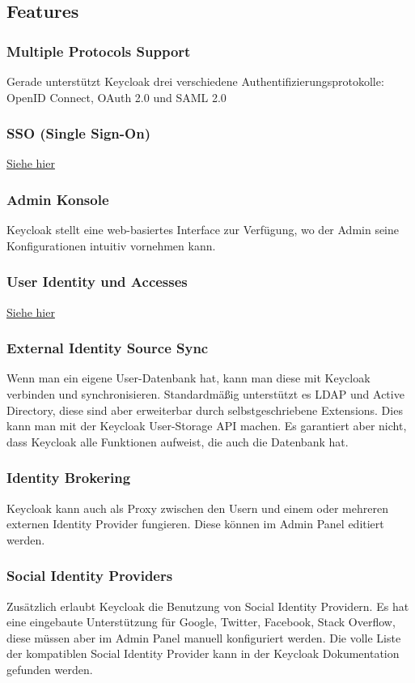 \subsection{Features}
\subsubsection{Multiple Protocols Support}
Gerade unterstützt Keycloak drei verschiedene Authentifizierungsprotokolle: OpenID Connect, OAuth 2.0 und SAML 2.0 \cite{KeyCloakDZone}
\subsubsection{SSO (Single Sign-On)}
\hyperref[sec:SSO]{Siehe hier}
\subsubsection{Admin Konsole}
Keycloak stellt eine web-basiertes Interface zur Verfügung, wo der Admin seine Konfigurationen intuitiv vornehmen kann. \cite{KeyCloakDZone}
\subsubsection{User Identity und Accesses}
\hyperref[sec:IAM]{Siehe hier}
\subsubsection{External Identity Source Sync}
Wenn man ein eigene User-Datenbank  hat, kann man diese mit Keycloak verbinden und synchronisieren. Standardmäßig unterstützt es LDAP und Active Directory, diese sind aber
erweiterbar durch selbstgeschriebene Extensions. Dies kann man mit der Keycloak User-Storage API machen. Es garantiert aber nicht, dass Keycloak alle Funktionen aufweist,
die auch die Datenbank hat. \cite{KeyCloakDZone}
\subsubsection{Identity Brokering}
Keycloak kann auch als Proxy zwischen den Usern und einem oder mehreren externen Identity Provider fungieren. Diese können im Admin Panel editiert werden. \cite{KeyCloakDZone}
\subsubsection{Social Identity Providers}
Zusätzlich erlaubt Keycloak die Benutzung von Social Identity Providern. Es hat eine eingebaute Unterstützung für Google, Twitter, Facebook, Stack Overflow, diese müssen aber 
im Admin Panel manuell konfiguriert werden. Die volle Liste der kompatiblen Social Identity Provider kann in der Keycloak Dokumentation gefunden werden. \cite{KeyCloakDZone}
